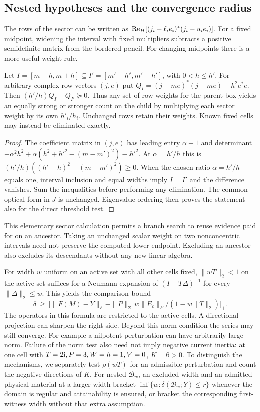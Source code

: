 \subsection{Nested hypotheses and the convergence radius}
The rows of the sector can be written as $\operatorname{Re}_{H}[(j_i-\ell_i e_i)^*(j_i-u_i e_i)]$. For a fixed midpoint, widening the interval with fixed multipliers subtracts a positive semidefinite matrix from the bordered pencil. For changing midpoints there is a more useful weight rule.
\begin{proposition}\label{th:transport}
Let $I=[m-h,m+h]\subseteq I'=[m'-h',m'+h']$, with $0<h\le h'$. For arbitrary complex row vectors $(j,e)$ put $Q_I=(j-me)^*(j-me)-h^2 e^*e$. Then $(h'/h)Q_I-Q_{I'}\succeq0$. Thus any set of row weights for the parent box yields an equally strong or stronger count on the child by multiplying each sector weight by its own $h'_i/h_i$. Unchanged rows retain their weights. Known fixed cells may instead be eliminated exactly.
\end{proposition}
\begin{proof}
The coefficient matrix in $(j,e)$ has leading entry $\alpha-1$ and determinant
$-\alpha^2 h^2+\alpha(h^2+h'^2-(m-m')^2)-h'^2$. At $\alpha=h'/h$ this is $(h'/h)((h'-h)^2-(m-m')^2)\ge0$. When the chosen ratio $\alpha=h'/h$ equals one, interval inclusion and equal widths imply $I=I'$ and the difference vanishes. Sum the inequalities before performing any elimination. The common optical form in $J$ is unchanged. Eigenvalue ordering then proves the statement also for the direct threshold test.
\end{proof}
This elementary sector calculation permits a branch search to reuse evidence paid for on an ancestor. Taking an unchanged scalar weight on two nonconcentric intervals need not preserve the computed lower endpoint. Excluding an ancestor also excludes its descendants without any new linear algebra.

For width $w$ uniform on an active set with all other cells fixed, $\|wT\|_2<1$ on the active set suffices for a Neumann expansion of $(I-T\Delta)^{-1}$ for every $\|\Delta\|_2\le w$. This yields the comparison bound
\begin{equation}
 \delta\ \ge\ \Big[\|F(M)-Y\|_F-
      \|P\|_2\,w\|E_c\|_F/(1-w\|T\|_2)\Big]_+ .
 \label{eq:neumann}
\end{equation}
The operators in this formula are restricted to the active cells. A directional projection can sharpen the right side. Beyond this norm condition the series may still converge. For example a nilpotent perturbation can have arbitrarily large norm. Failure of the norm test also need not imply negative current inertia: at one cell with $T=2{\rm i},P=3,W=h=1,V=0$, $K=6>0$. To distinguish the mechanisms, we separately test $\rho(wT)$ for an admissible perturbation and count the negative directions of $K$. For nested $\mathcal B_w$, an excluded width and an admitted physical material at a larger width bracket $\inf\{w:\delta(\mathcal B_w;Y)\le r\}$ whenever the domain is regular and attainability is ensured, or bracket the corresponding first-witness width without that extra assumption.
